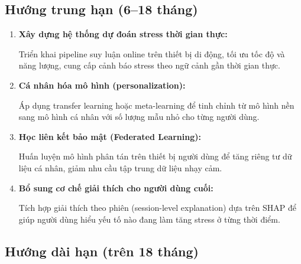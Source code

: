 \subsection{Hướng trung hạn (6--18 tháng)}

\begin{enumerate}
    \item \textbf{Xây dựng hệ thống dự đoán stress thời gian thực:}
    
    Triển khai pipeline suy luận online trên thiết bị di động, tối ưu tốc độ và năng lượng, cung cấp cảnh báo stress theo ngữ cảnh gần thời gian thực.

    \item \textbf{Cá nhân hóa mô hình (personalization):}
    
    Áp dụng transfer learning hoặc meta-learning để tinh chỉnh từ mô hình nền sang mô hình cá nhân với số lượng mẫu nhỏ cho từng người dùng.

    \item \textbf{Học liên kết bảo mật (Federated Learning):}
    
    Huấn luyện mô hình phân tán trên thiết bị người dùng để tăng riêng tư dữ liệu cá nhân, giảm nhu cầu tập trung dữ liệu nhạy cảm.

    \item \textbf{Bổ sung cơ chế giải thích cho người dùng cuối:}
    
    Tích hợp giải thích theo phiên (session-level explanation) dựa trên SHAP để giúp người dùng hiểu yếu tố nào đang làm tăng stress ở từng thời điểm.
\end{enumerate}

\subsection{Hướng dài hạn (trên 18 tháng)}

